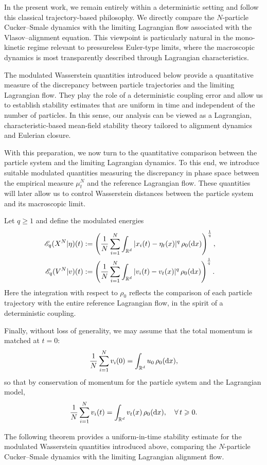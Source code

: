 \documentclass[10pt,reqno]{amsart}
\renewcommand{\geq}{\geqslant}
\renewcommand{\ge}{\geqslant}
\numberwithin{equation}{section}
\newcommand{\R}{\mathbb R}
\newcommand{\lt}{\left}
\newcommand{\rt}{\right}
\newcommand{\intr}{\int_{\R^d}}
\newcommand{\dx}{\textnormal{d}x}
\begin{document}
In the present work, we remain entirely within a deterministic setting and follow this classical trajectory-based philosophy. We directly compare the $N$-particle Cucker--Smale dynamics with the limiting Lagrangian flow associated with the Vlasov--alignment equation. This viewpoint is particularly natural in the mono-kinetic regime relevant to pressureless Euler-type limits, where the macroscopic dynamics is most transparently described through Lagrangian characteristics.

The modulated Wasserstein quantities introduced below provide a quantitative measure of the discrepancy between particle trajectories and the limiting Lagrangian flow. They play the role of a deterministic coupling error and allow us to establish stability estimates that are uniform in time and independent of
the number of particles. In this sense, our analysis can be viewed as a Lagrangian, characteristic-based mean-field stability theory tailored to alignment dynamics and Eulerian closure.
 
With this preparation, we now turn to the quantitative comparison between the particle system and the limiting Lagrangian dynamics. To this end, we introduce suitable modulated quantities measuring the discrepancy in phase space between the empirical measure $\mu_t^N$ and the reference Lagrangian flow. These quantities will later allow us to control Wasserstein distances between the particle system and its macroscopic limit.

Let $q\ge1$ and define the modulated energies
\begin{align*}
\mathscr{E}_q(X^N|\eta)(t)  &:= \lt( \frac1N\sum_{i=1}^N \intr |x_i(t) - \eta_t(x)|^q \,\rho_0(\dx)\rt)^\frac1q, \cr
\mathscr{E}_q(V^N|v)(t) &:= \lt(\frac1N\sum_{i=1}^N \intr |v_i(t) - v_t(x)|^q \,\rho_0(\dx)\rt)^\frac1q.
\end{align*}
Here the integration with respect to $\rho_0$ reflects the comparison of each particle trajectory with the entire reference Lagrangian flow, in the spirit of a deterministic coupling.

Finally, without loss of generality, we may assume that the total momentum is matched at $t=0$:
\[
\frac1N \sum_{i=1}^N v_i(0) = \intr  u_0\,\rho_0(\dx), 
\]
so that by conservation of momentum for the particle system and the Lagrangian model, 
\[
\frac1N \sum_{i=1}^N v_i(t) = \intr v_t(x)\,\rho_0(\dx), \quad \forall\, t \geq 0. 
\]
 

The following theorem provides a uniform-in-time stability estimate for the modulated Wasserstein quantities introduced above, comparing the $N$-particle Cucker--Smale dynamics with the limiting Lagrangian alignment flow.
\end{document}
